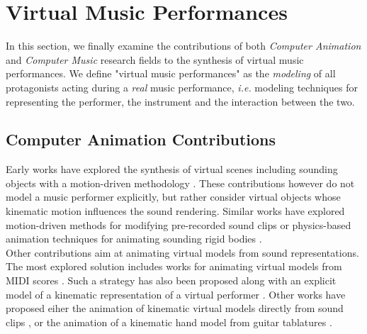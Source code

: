 {{%



	\section{Virtual Music Performances}
	\label{sec:SMP}

In this section, we finally examine the contributions of both \emph{Computer Animation} and \emph{Computer Music} research fields to the synthesis of virtual music performances. We define "virtual music performances" as the \emph{modeling} of all protagonists acting during a \emph{real} music performance, \emph{i.e.} modeling techniques for representing the performer, the instrument and the interaction between the two.


		\subsection{Computer Animation Contributions}
		\label{subsec:SMP_CAC}

Early works have explored the synthesis of virtual scenes including sounding objects with a motion-driven methodology . These contributions however do not model a music performer explicitly, but rather consider virtual objects whose kinematic motion influences the sound rendering. Similar works have explored motion-driven methods for modifying pre-recorded sound clips  or physics-based animation techniques for animating sounding rigid bodies .\\

Other contributions aim at animating virtual models from sound representations. The most explored solution includes works for animating virtual models from MIDI scores . Such a strategy has also been proposed along with an explicit model of a kinematic representation of a virtual performer . Other works have proposed eiher the animation of kinematic virtual models directly from sound clips , or the animation of a kinematic hand model from guitar tablatures .\\

}}
